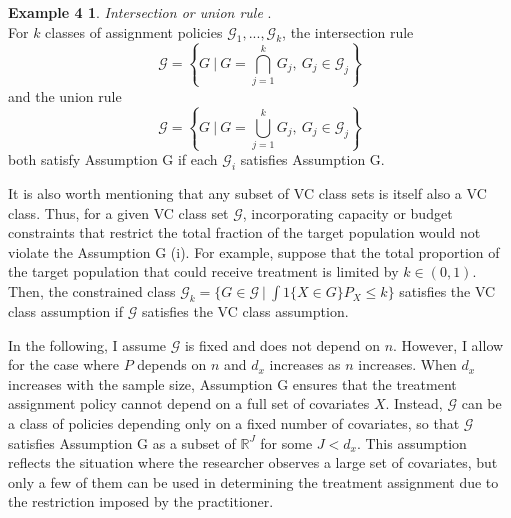 \documentclass[12pt,oneside,reqno,english]{amsart}
\theoremstyle{definition}
\newtheorem*{ex4}{Example 4}
\begin{document}
\begin{ex4} \textit{Intersection or union rule} \citep{KT:18}.\\
For $k$ classes of assignment policies $\mathcal{G}_{1},...,\mathcal{G}_{k}$, the intersection rule 
\[\mathcal{G}=\left\{G \ | \ G=\bigcap_{j=1}^{k}G_{j},\ G_{j}\in \mathcal{G}_{j}  \right\}\] 
and the union rule 
\[\mathcal{G}=\left\{G \ | \ G=\bigcup_{j=1}^{k}G_{j},\ G_{j}\in \mathcal{G}_{j} \right\}\] both satisfy Assumption G if each $\mathcal{G}_{i}$ satisfies Assumption G. 
\end{ex4} 
It is also worth mentioning that any subset of VC class sets is itself also a VC class. 
Thus, for a given VC class set $\mathcal{G}$,
incorporating capacity or budget constraints that restrict the total fraction of the target population would not violate the Assumption G (i).
For example, suppose that the total proportion of the target population that could receive treatment is limited by $k\in (0,1)$.
Then, the constrained class $\mathcal{G}_{k} = \{G\in \mathcal{G}\ | \ \int 1\{X\in G\}P_{X} \leq k\}$ satisfies the VC class assumption 
if $\mathcal{G}$ satisfies the VC class assumption.


In the following, I assume $\mathcal{G}$ is fixed and does not depend on $n$. However, I allow for the case where 
$P$ depends on $n$ and $d_{x}$ increases as $n$ increases. 
When $d_{x}$ increases with the sample size, Assumption G ensures that the treatment assignment policy cannot depend on a full set of covariates $X$.
Instead, $\mathcal{G}$ can be a class of policies depending only on a fixed number of covariates, so that $\mathcal{G}$ satisfies Assumption G as a subset of $\mathbb{R}^{J}$ for some $J< d_{x}$. This assumption reflects the situation where the researcher observes a large set of covariates, but only a few of them can be used in determining the treatment assignment due to the restriction imposed by the practitioner. 
\end{document}
